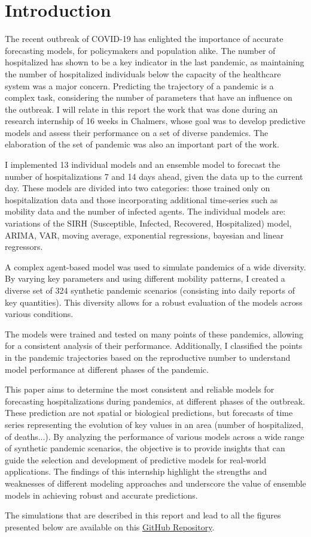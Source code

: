 \section{Introduction}

The recent outbreak of COVID-19 has enlighted the importance of accurate forecasting models, for policymakers and population alike. 
The number of hospitalized has shown to be a key indicator in the last pandemic, as maintaining the number of hospitalized individuals below the capacity of the healthcare system was a major concern.
Predicting the trajectory of a pandemic is a complex task, considering the number of parameters that have an influence on the outbreak. 
I will relate in this report the work that was done during an research internship of 16 weeks in Chalmers, whose goal was to develop predictive models and assess their performance on a set of diverse pandemics. 
The elaboration of the set of pandemic was also an important part of the work. 

I implemented 13 individual models and an ensemble model to forecast the number of hospitalizations 7 and 14 days ahead, given the data up to the current day.
These models are divided into two categories: those trained only on hospitalization data and those incorporating additional time-series such as mobility data and the number of infected agents. 
The individual models are: variations of the SIRH (Susceptible, Infected, Recovered, Hospitalized) model, ARIMA, VAR, moving average, exponential regressions, bayesian and linear regressors.

A complex agent-based model was used to simulate pandemics of a wide diversity. 
By varying key parameters and using different mobility patterns, I created a diverse set of 324 synthetic pandemic scenarios (consisting into daily reports of key quantities). 
This diversity allows for a robust evaluation of the models across various conditions.

The models were trained and tested on many points of these pandemics, allowing for a consistent analysis of their performance. 
Additionally, I classified the points in the pandemic trajectories based on the reproductive number to understand model performance at different phases of the pandemic.

This paper aims to determine the most consistent and reliable models for forecasting hospitalizations during pandemics, at different phases of the outbreak. 
These prediction are not spatial or biological predictions, but forecasts of time series representing the evolution of key values in an area (number of hospitalized, of deaths...). 
By analyzing the performance of various models across a wide range of synthetic pandemic scenarios, the objective is to provide insights that can guide the selection and development of predictive models for real-world applications. 
The findings of this internship highlight the strengths and weaknesses of different modeling approaches and underscore the value of ensemble models in achieving robust and accurate predictions.

The simulations that are described in this report and lead to all the figures presented below are available on this  \href{https://github.com/gregoirebechade/covid_internship}{GitHub Repository}\label{github-link}.

